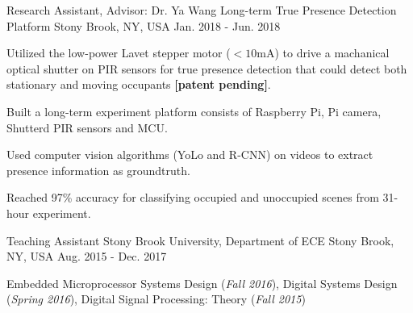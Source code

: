 \begin{cventries}
  \cventry
    {Research Assistant, Advisor: Dr. Ya Wang} %
    {Long-term True Presence Detection Platform} %
    {Stony Brook, NY, USA} %
    {Jan. 2018 - Jun. 2018} %
    {
      \begin{cvitems} %
        \item Utilized the low-power Lavet stepper motor ($<10$mA) to drive a machanical optical shutter on PIR sensors for true presence detection that could detect both stationary and moving occupants \textbf{[patent pending]}.
        \item Built a long-term experiment platform consists of Raspberry Pi, Pi camera, Shutterd PIR sensors and MCU.
        \item Used computer vision algorithms (YoLo and R-CNN) on videos to extract presence information as groundtruth.
        \item Reached 97\% accuracy for classifying occupied and unoccupied scenes from 31-hour experiment.
      \end{cvitems}
    }


  \cventry
    {Teaching Assistant} %
    {Stony Brook University, Department of ECE} %
    {Stony Brook, NY, USA} %
    {Aug. 2015 - Dec. 2017} %
    {
      \begin{cvitems} %
        \item Embedded Microprocessor Systems Design (\textit{Fall 2016}), Digital Systems Design (\textit{Spring 2016}), Digital Signal Processing: Theory (\textit{Fall 2015}) 
      \end{cvitems}
    }

\end{cventries}
